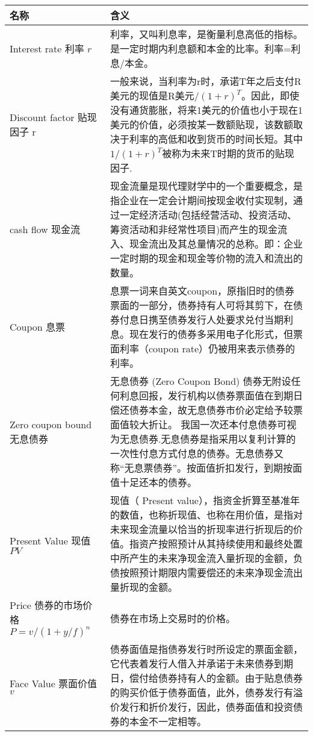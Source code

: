   \begin{longtable}{lX}
%

    \hline
    名称 & 含义  \\ \hline
    Interest rate 利率 $r$& 利率，又叫利息率，是衡量利息高低的指标。是一定时期内利息额和本金的比率。利率=利息/本金。\\ \hline
    Discount factor 贴现因子 r &一般来说，当利率为r时，承诺T年之后支付R美元的现值是R美元/$(1+r)^T$。因此，即使没有通货膨胀，将来1美元的价值也小于现在1美元的价值，必须按某一数额贴现，该数额取决于利率的高低和收到货币的时间长短。其中$1/(1+r)^T$被称为未来T时期的货币的贴现因子. \\ \hline

    cash flow 现金流  &现金流量是现代理财学中的一个重要概念，是指企业在一定会计期间按现金收付实现制，通过一定经济活动(包括经营活动、投资活动、筹资活动和非经常性项目)而产生的现金流入、现金流出及其总量情况的总称。即：企业一定时期的现金和现金等价物的流入和流出的数量。\\ \hline
    Coupon 息票  & 息票一词来自英文coupon，原指旧时的债券票面的一部分，债券持有人可将其剪下，在债券付息日携至债券发行人处要求兑付当期利息。现在发行的债券多采用电子化形式，但票面利率（coupon rate）仍被用来表示债券的利率。\\ \hline
    Zero coupon bound 无息债券 & 无息债券 (Zero Coupon Bond) 债券无附设任何利息回报，发行机构以债券票面值在到期日偿还债券本金，故无息债券市价必定给予较票面值较大折让。 我国一次还本付息债券可视为无息债券.无息债券是指采用以复利计算的一次性付息方式付息的债券。无息债券又称“无息票债券”。按面值折扣发行，到期按面值十足还本的债券。\\ \hline

    Present Value 现值 $PV$ & 现值（ Present value），指资金折算至基准年的数值，也称折现值、也称在用价值，是指对未来现金流量以恰当的折现率进行折现后的价值。指资产按照预计从其持续使用和最终处置中所产生的未来净现金流入量折现的金额，负债按照预计期限内需要偿还的未来净现金流出量折现的金额。\\ \hline
    Price 债券的市场价格  $P=v/{(1+y/f)^n} $& 债券在市场上交易时的价格。\\ \hline
    Face Value 票面价值  $v$& 债券面值是指债券发行时所设定的票面金额，它代表着发行人借入并承诺于未来债券到期日，偿付给债券持有人的金额。由于贴息债券的购买价低于债券面值，此外，债券发行有溢价发行和折价发行，因此，债券面值和投资债券的本金不一定相等。\\ \hline


\end{longtable}
